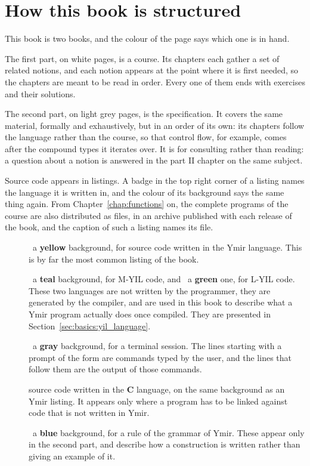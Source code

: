 \section{How this book is structured}
\label{sec:basics:structure}

This book is two books, and the colour of the page says which one is in hand.

The first part, on white pages, is a course. Its chapters each gather a set of
related notions, and each notion appears at the point where it is first needed,
so the chapters are meant to be read in order. Every one of them ends with
exercises and their solutions.

The second part, on light grey pages, is the specification. It covers the same
material, formally and exhaustively, but in an order of its own: its chapters
follow the language rather than the course, so that control flow, for example,
comes after the compound types it iterates over. It is for consulting rather
than reading: a question about a notion is answered in the part II chapter on
the same subject.

Source code appears in listings. A badge in the top right corner of a listing
names the language it is written in, and the colour of its background says the
same thing again. From Chapter~\ref{chap:functions} on, the complete
programs of the course are also distributed as files, in an archive published
with each release of the book, and the caption of such a listing names its file.

\begin{description}
\item[\ymirbadgeymir] ~a
  \textbf{yellow} background, for source code written in the Ymir language. This
  is by far the most common listing of the book.
\item[\ymirbadgemyil] ~a
  \textbf{teal} background, for M-YIL code, and
  ~a \textbf{green} one, for L-YIL
  code. These two languages are not written by the programmer, they are
  generated by the compiler, and are used in this book to describe what a Ymir
  program actually does once compiled. They are presented in
  Section~\ref{sec:basics:yil_language}.
\item[\ymirbadgeshell] ~a
  \textbf{gray} background, for a terminal session. The lines starting with a
  prompt of the form  are commands typed
  by the user, and the lines that follow them are the output of those commands.
\item[\ymirbadgec] source code written in the \textbf{C} language, on the same
  background as an Ymir listing. It appears only where a program has to be
  linked against code that is not written in Ymir.
\item[\ymirbadgegrammar] ~a
  \textbf{blue} background, for a rule of the grammar of Ymir. These appear only
  in the second part, and describe how a construction is written rather than
  giving an example of it.
\end{description}

